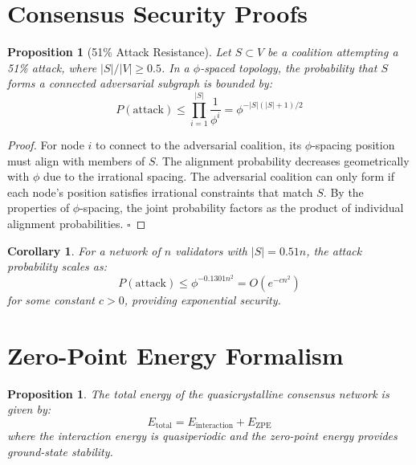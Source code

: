 \documentclass[12pt]{article}
\newtheorem lemma}[theorem]{Lemma}
\newtheorem{corollary}[theorem]{Corollary}
\newtheorem{prop}[theorem]{Proposition}
\begin{document}
\section{Consensus Security Proofs}

\begin{prop}[51\% Attack Resistance]
Let $S \subset V$ be a coalition attempting a 51\% attack, where $|S|/|V| \geq 0.5$. In a $\phi$-spaced topology, the probability that $S$ forms a connected adversarial subgraph is bounded by:
\begin{equation}
P(\text{attack}) \leq \prod_{i=1}^{|S|} \frac{1}{\phi^i} = \phi^{-|S|(|S|+1)/2}
\label{eq:attack_bound}
\end{equation}
\end{prop}

\begin{proof}
For node $i$ to connect to the adversarial coalition, its $\phi$-spacing position must align with members of $S$. The alignment probability decreases geometrically with $\phi$ due to the irrational spacing. The adversarial coalition can only form if each node's position satisfies irrational constraints that match $S$. By the properties of $\phi$-spacing, the joint probability factors as the product of individual alignment probabilities. $\square$
\end{proof}

\begin{corollary}
For a network of $n$ validators with $|S| = 0.51n$, the attack probability scales as:
\begin{equation}
P(\text{attack}) \leq \phi^{-0.1301n^2} = O(e^{-cn^2})
\label{eq:exp_bound}
\end{equation}
for some constant $c > 0$, providing exponential security.
\end{corollary}

\section{Zero-Point Energy Formalism}

\begin{prop}
The total energy of the quasicrystalline consensus network is given by:
\begin{equation}
E_{\text{total}} = E_{\text{interaction}} + E_{\text{ZPE}}
\label{eq:energy_total}
\end{equation}
where the interaction energy is quasiperiodic and the zero-point energy provides ground-state stability.
\end{prop}
\end{document}
